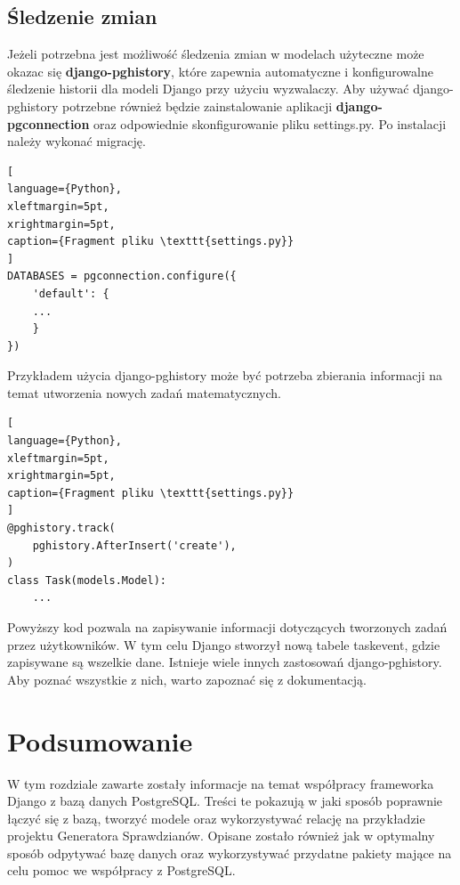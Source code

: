 \documentclass[oneside,polski,logo,indent]{amuthesis}
\begin{document}
\begin{enumerate}
\begin{enumerate}
\subsection{Śledzenie zmian}
Jeżeli potrzebna jest możliwość śledzenia zmian w modelach użyteczne może okazac się \textbf{django-pghistory}, które zapewnia automatyczne i konfigurowalne śledzenie historii dla modeli Django przy użyciu wyzwalaczy. Aby używać django-pghistory potrzebne również będzie zainstalowanie aplikacji \textbf{django-pgconnection} oraz odpowiednie skonfigurowanie pliku settings.py. Po instalacji należy wykonać migrację.
\begin{lstlisting}[
language={Python},
xleftmargin=5pt,
xrightmargin=5pt,
caption={Fragment pliku \texttt{settings.py}}
]
DATABASES = pgconnection.configure({
    'default': {
	...
    }
})
\end{lstlisting}
Przykładem użycia django-pghistory może być potrzeba zbierania informacji na temat utworzenia nowych zadań matematycznych.
\begin{lstlisting}[
language={Python},
xleftmargin=5pt,
xrightmargin=5pt,
caption={Fragment pliku \texttt{settings.py}}
]
@pghistory.track(
    pghistory.AfterInsert('create'),
)
class Task(models.Model):
	...
\end{lstlisting}
Powyższy kod pozwala na zapisywanie informacji dotyczących tworzonych zadań przez użytkowników. W tym celu Django stworzył nową tabele taskevent, gdzie zapisywane są wszelkie dane.
Istnieje wiele innych zastosowań django-pghistory. Aby poznać wszystkie z nich, warto zapoznać się z dokumentacją.
\section{Podsumowanie}
W tym rozdziale zawarte zostały informacje na temat współpracy frameworka Django z bazą danych PostgreSQL. Treści te pokazują w jaki sposób poprawnie łączyć się z bazą, tworzyć modele oraz wykorzystywać relację na przykładzie projektu Generatora Sprawdzianów. Opisane zostało również jak w optymalny sposób odpytywać bazę danych oraz wykorzystywać przydatne pakiety mające na celu pomoc we współpracy z PostgreSQL.

\end{enumerate}
\end{enumerate}
\end{document}
